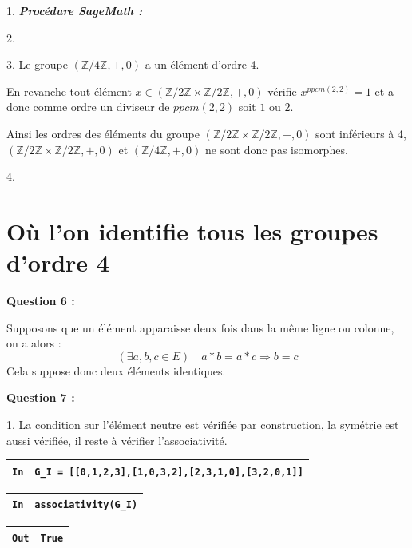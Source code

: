 \documentclass[titlepage]{article}
\begin{document}
    1. \emph{\textbf{Procédure SageMath :}}

    

    2.\newline

    3. Le groupe $(\mathbb{Z}/4\mathbb{Z}, +, 0)$ a un élément d'ordre 4.\newline
    
    En revanche tout élément $x \in (\mathbb{Z}/2\mathbb{Z} \times \mathbb{Z}/2\mathbb{Z}, +, 0)$ vérifie $x^{ppcm(2,2)} = 1$ et a donc comme ordre un diviseur de $ppcm(2,2)$ soit $1$ ou $2$.\newline
    
    Ainsi les ordres des éléments du groupe $(\mathbb{Z}/2\mathbb{Z} \times \mathbb{Z}/2\mathbb{Z}, +, 0)$ sont inférieurs à 4, $(\mathbb{Z}/2\mathbb{Z} \times \mathbb{Z}/2\mathbb{Z}, +, 0)$ et $(\mathbb{Z}/4\mathbb{Z}, +, 0)$ ne sont donc pas isomorphes.\newline
    
    4.
    \section{Où l’on identifie tous les groupes d’ordre 4}
    \textbf{Question 6 :}

    Supposons que un élément apparaisse deux fois dans la même ligne ou colonne, on a alors :
    \[(\exists a, b, c \in E) \quad a*b=a*c \Longrightarrow b = c\]
    Cela suppose donc deux éléments identiques.\newline

    \textbf{Question 7 :}

    1. La condition sur l'élément neutre est vérifiée par construction, la symétrie est aussi vérifiée, il reste à vérifier l'associativité.\newline
    
    \begin{tabularx}{11.5cm}{|p{0.60cm}|X|}
        \hline
        \verb|In|
        & 
        \verb|G_I = [[0,1,2,3],[1,0,3,2],[2,3,1,0],[3,2,0,1]]|
        \\
        \hline
    \end{tabularx}\newline
    \begin{tabularx}{11.5cm}{|p{0.60cm}|X|}
        \hline
        \verb|In|
        & 
        \verb|associativity(G_I)|
        \\
        \hline
    \end{tabularx}\newline
    \begin{tabularx}{11.5cm}{|p{0.60cm}|X|}
        \hline
        \verb|Out|
        & 
        \verb|True|
        \\
        \hline
    \end{tabularx}\newline\newline
\end{document}

